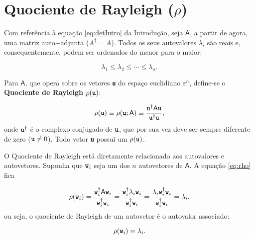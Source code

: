 \chapter{Quociente de Rayleigh ($\rho$)\label{cap:algebra}}

Com referência à equação \ref{eq:detIntro} da Introdução, seja $\mathsf{A}$, a partir de agora, uma matriz auto$-$adjunta ($A^{\dag} = A$). Todos os seus autovalores $\lambda_i$ são reais e, consequentemente, podem ser ordenados do menor para o maior:

	\begin{equation}\label{eq:autovalores_ordenados}
		\lambda_1 \leq \lambda_2 \leq \cdots \leq \lambda_n.
	\end{equation}

Para $\mathsf{A}$, que opera sobre os vetores \textbf{\texttt{u}} do espaço euclidiano $\varepsilon^n$, define-se o \textbf{Quociente de Rayleigh} $\rho (\textbf{\texttt{u}})$:

\begin{equation}\label{eq:rho}
	\rho (\textbf{\texttt{u}}) \equiv \rho(\textbf{\texttt{u}}; \mathsf{A}) \equiv \frac{\textbf{\texttt{u}}^\dag \mathsf{A}\textbf{\texttt{u}}}{\textbf{\texttt{u}}^\dag \textbf{\texttt{u}}}, 
\end{equation}
onde $\textbf{\texttt{u}}^\dag$ é o complexo conjugado de $\textbf{\texttt{u}}$, que por sua vez deve ser sempre diferente de zero ($\textbf{\texttt{u}} \neq 0$). Todo vetor \textbf{\texttt{u}} possui um $\rho(\textbf{\texttt{u}})$.

	O Quociente de Rayleigh está diretamente relacionado aos autovalores e autovetores. Suponha que $\textbf{\texttt{w}}_i$ seja um dos $n$ autovetores de $\mathsf{A}$. A equação \ref{eq:rho} fica
	
	\begin{equation}\label{eq:rho_no_w}
		\rho(\textbf{\texttt{w}}_i) = \frac{\textbf{\texttt{w}}_i^\dag \mathsf{A} \textbf{\texttt{w}}_i}{ \textbf{\texttt{w}}_i^\dag \textbf{\texttt{w}}_i} = \frac{\textbf{\texttt{w}}_i^\dag  \lambda_i \textbf{\texttt{w}}_i}{\textbf{\texttt{w}}_i^\dag \textbf{\texttt{w}}_i} = \frac{ \lambda_i \textbf{\texttt{w}}_i^\dag  \textbf{\texttt{w}}_i}{\textbf{\texttt{w}}_i^\dag \textbf{\texttt{w}}_i} = \lambda_i,
	\end{equation}
	ou seja, o quociente de Rayleigh de um autovetor é o autovalor associado:
	
	\begin{equation}\label{eq:rho_no_w_eh_lambda}
		\rho (\textbf{\texttt{w}}_i) = \lambda_i.
	\end{equation}
	
